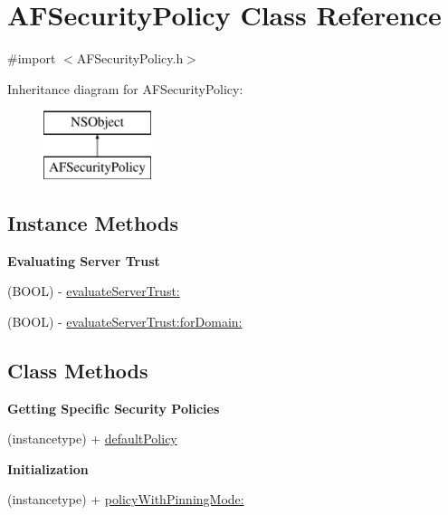 \hypertarget{interface_a_f_security_policy}{}\section{A\+F\+Security\+Policy Class Reference}
\label{interface_a_f_security_policy}


{\ttfamily \#import $<$A\+F\+Security\+Policy.\+h$>$}

Inheritance diagram for A\+F\+Security\+Policy\+:\begin{figure}[H]
\begin{center}
\leavevmode
\includegraphics[height=2.000000cm]{interface_a_f_security_policy}
\end{center}
\end{figure}
\subsection*{Instance Methods}
\begin{Indent}{\bf Evaluating Server Trust}\par
{\em 

 

 }\begin{DoxyCompactItemize}
\item 
(B\+O\+O\+L) -\/ \hyperlink{interface_a_f_security_policy_a404e83f245843cb7fd6408d5e9ee15e0}{evaluate\+Server\+Trust\+:}
\item 
(B\+O\+O\+L) -\/ \hyperlink{interface_a_f_security_policy_ae22b5069f31f0eae3cc0ca07fe876c68}{evaluate\+Server\+Trust\+:for\+Domain\+:}
\end{DoxyCompactItemize}
\end{Indent}
\subsection*{Class Methods}
\begin{Indent}{\bf Getting Specific Security Policies}\par
{\em 

 

 }\begin{DoxyCompactItemize}
\item 
(instancetype) + \hyperlink{interface_a_f_security_policy_aa63c18e904ef6e42761b7c20a1af2f3f}{default\+Policy}
\end{DoxyCompactItemize}
\end{Indent}
\begin{Indent}{\bf Initialization}\par
{\em 

 

 }\begin{DoxyCompactItemize}
\item 
(instancetype) + \hyperlink{interface_a_f_security_policy_a94c44f7101fa4d0954d0c63f72f1e9cd}{policy\+With\+Pinning\+Mode\+:}
\end{DoxyCompactItemize}
\end{Indent}
